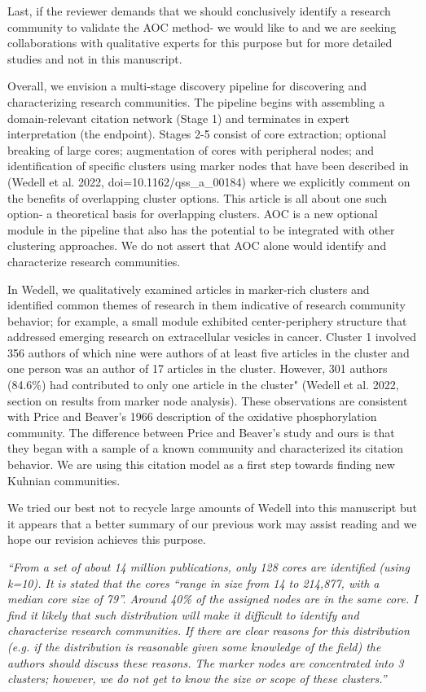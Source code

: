 \documentclass[11pt, oneside]{article}   	%
\begin{document}
Last, if the reviewer demands that we should conclusively identify a research community to validate the AOC method- we would like to and we are seeking collaborations with qualitative experts for this purpose but for more detailed studies and not in this manuscript.

Overall, we envision a multi-stage discovery pipeline for discovering and characterizing research communities. The pipeline begins with assembling a domain-relevant citation network (Stage 1) and terminates in expert interpretation (the endpoint). Stages 2-5 consist of core extraction; optional breaking of large cores; augmentation of cores with peripheral nodes; and identification of specific clusters using marker nodes that have been described in (Wedell et al. 2022, doi=10.1162/qss\_a\_00184) where we explicitly comment on the benefits of overlapping cluster options. This article is all about one such option- a theoretical basis for overlapping clusters. AOC is a new optional module in the pipeline  that also has the potential to be integrated with other clustering approaches. We do not assert that AOC alone would identify and characterize research communities.

In Wedell, we qualitatively examined articles in marker-rich clusters and identified common themes of research in them indicative of research community behavior; for example, a small module exhibited center-periphery structure that addressed emerging research on extracellular vesicles in cancer. Cluster 1 involved 356 authors of which nine were authors of at least five articles in the cluster and one person was an author of 17 articles in the cluster. However, 301 authors (84.6\%) had contributed to only one article in the cluster" (Wedell et al. 2022, section on results from marker node analysis). These observations are consistent with Price and Beaver's 1966 description of the oxidative phosphorylation community. The difference between Price and Beaver's study and ours is that they began with a sample of a known community and characterized its citation behavior. We are using this citation model as a first step towards finding new Kuhnian communities.

We tried our best not to recycle large amounts of Wedell into this manuscript but it appears that a better summary of our previous work may assist reading and we hope our revision achieves this purpose. 

\emph{``From a set of about 14 million publications, only 128 cores are identified (using k=10). It is stated that the cores “range in size from 14 to 214,877, with a median core size of 79”. Around 40\% of the assigned nodes are in the same core. I find it likely that such distribution will make it difficult to identify and characterize research communities. If there are clear reasons for this distribution (e.g. if the distribution is reasonable given some knowledge of the field) the authors should discuss these reasons. The marker nodes are concentrated into 3 clusters; however, we do not get to know the size or scope of these clusters.''}
\end{document}
